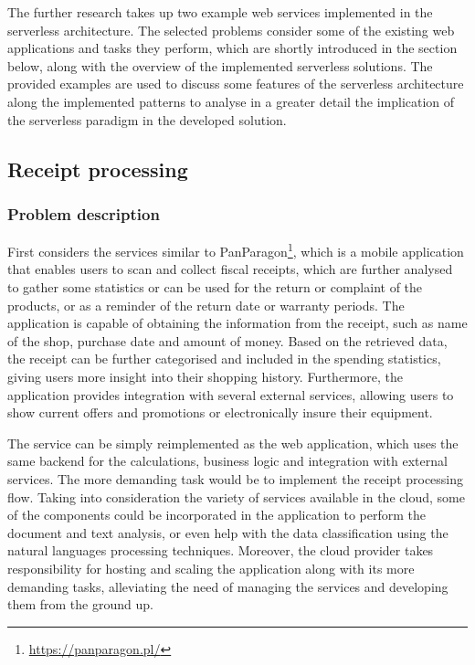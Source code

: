 The further research takes up two example web services implemented in the serverless architecture.
The selected problems consider some of the existing web applications and tasks they perform, which are shortly introduced in the section below, along with the overview of the implemented serverless solutions.
The provided examples are used to discuss some features of the serverless architecture along the implemented patterns to analyse in a greater detail the implication of the serverless paradigm in the developed solution.

\subsection{Receipt processing} \label{chapter:examples-receipt-processing}

\subsubsection{Problem description}

First considers the services similar to PanParagon\footnote{\url{https://panparagon.pl/}}, which is a mobile application that enables users to scan and collect fiscal receipts, which are further analysed to gather some statistics or can be used for the return or complaint of the products, or as a reminder of the return date or warranty periods.
The application is capable of obtaining the information from the receipt, such as name of the shop, purchase date and amount of money. Based on the retrieved data, the receipt can be further categorised and included in the spending statistics, giving users more insight into their shopping history. Furthermore, the application provides integration with several external services, allowing users to show current offers and promotions or electronically insure their equipment.

The service can be simply reimplemented as the web application, which uses the same backend for the calculations, business logic and integration with external services. The more demanding task would be to implement the receipt processing flow. Taking into consideration the variety of services available in the cloud, some of the components could be incorporated in the application to perform the document and text analysis, or even help with the data classification using the natural languages processing techniques. Moreover, the cloud provider takes responsibility for hosting and scaling the application along with its more demanding tasks, alleviating the need of managing the services and developing them from the ground up.

